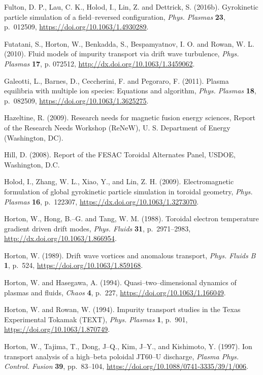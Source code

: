 \documentclass[a4paper,openany,12pt]{book}
\begin{document}
\begin{thebibliography}{100}
\bibitem{}
Fulton, D. P., Lau, C. K., Holod, I., Lin, Z. and Dettrick, S. (2016b). Gyrokinetic particle simulation of a field--reversed configuration, \emph{Phys. Plasmas} \textbf{23}, p.~012509, \url{https://doi.org/10.1063/1.4930289}.

\bibitem{}
Futatani, S., Horton, W., Benkadda, S., Bespamyatnov, I. O. and Rowan, W. L. (2010). Fluid models of impurity transport via drift wave turbulence, \emph{Phys. Plasmas} \textbf{17}, p. 072512, 
\url{http://dx.doi.org/10.1063/1.3459062}.

\bibitem{}
Galeotti, L., Barnes, D., Ceccherini, F. and Pegoraro, F. (2011). Plasma equilibria with multiple ion species: Equations and algorithm, \emph{Phys. Plasmas} \textbf{18}, p.~082509, \url{https://doi.org/10.1063/1.3625275}.

\bibitem{}
Hazeltine, R. (2009). Research needs for magnetic fusion energy sciences, Report of the Research Needs Workshop (ReNeW), U. S. Department of Energy (Washington, DC).

\bibitem{}
Hill, D. (2008). Report of the FESAC Toroidal Alternates Panel, USDOE, Washington, D.C.

\bibitem{}
Holod, I., Zhang, W. L., Xiao, Y., and Lin, Z. H. (2009). Electromagnetic formulation of global gyrokinetic particle simulation in toroidal geometry, \emph{Phys. Plasmas} \textbf{16}, p.~122307, \url{https://dx.doi.org/10.1063/1.3273070}.

\bibitem{}
Horton, W., Hong, B.--G. and Tang, W. M. (1988). Toroidal electron temperature gradient driven drift modes, 
\emph{Phys. Fluids} \textbf{31}, p.~2971--2983, \url{http://dx.doi.org/10.1063/1.866954}.

\bibitem{}
Horton, W. (1989). Drift wave vortices and anomalous transport, \emph{Phys. Fluids B} \textbf{1}, p.~524, 
\url{https://doi.org/10.1063/1.859168}.

\bibitem{}
Horton, W. and Hasegawa, A. (1994). Quasi--two--dimensional dynamics of plasmas and fluids, \emph{Chaos} 
\textbf{4}, p.~227, \url{https://doi.org/10.1063/1.166049}.

\bibitem{}
Horton, W. and Rowan, W. (1994). Impurity transport studies in the Texas Experimental Tokamak (TEXT), \emph{Phys. Plasmas} \textbf{1}, p.~901, \url{https://doi.org/10.1063/1.870749}.

\bibitem{}
Horton, W., Tajima, T., Dong, J--Q., Kim, J--Y., and Kishimoto, Y. (1997). Ion transport analysis of a high--beta poloidal JT60--U discharge, \emph{Plasma Phys. Control. Fusion} \textbf{39}, pp.~83--104,
\url{https://doi.org/10.1088/0741-3335/39/1/006}.


\end{thebibliography}
\end{document}

